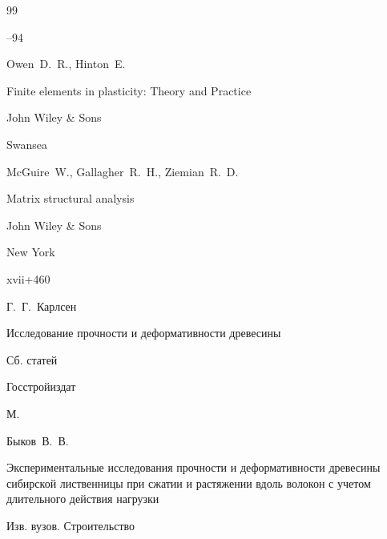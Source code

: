 \begin{thebibliography}{99}

--94








\by Owen~D.~R., Hinton~E.

\book Finite elements in plasticity: Theory and Practice


\publ John Wiley \& Sons

\publaddr Swansea





\by McGuire~W., Gallagher~R.~H., Ziemian~R.~D. 

\book Matrix structural analysis

\publ John Wiley \& Sons

\publaddr  New York


\totalpages xvii+460




\ed Г.~Г.~Карл\-сен

\book Исследование прочности и деформативности древесины

\bookinfo Сб. статей


\publ Госстройиздат

\publaddr М.





\by Быков~В.~В.

\paper Экспериментальные исследования прочности и деформативности древесины сибирской лиственницы при сжатии и растяжении вдоль волокон с учетом длительного действия нагрузки

\jour Изв. вузов. Строительство



\end{thebibliography}
